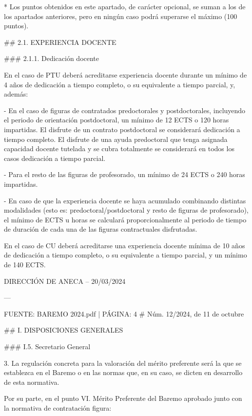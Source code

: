 \documentclass{article}
\begin{document}
\begin{itemize}
\begin{itemize}
\begin{scriptsize}
                  * Los puntos obtenidos en este apartado, de carácter opcional, se suman a los de los apartados anteriores, pero en ningún caso podrá superarse el máximo (100 puntos).

                  \#\# 2.1. EXPERIENCIA DOCENTE

                  \#\#\# 2.1.1. Dedicación docente

                  En el caso de PTU deberá acreditarse experiencia docente durante un mínimo de 4 años de dedicación a tiempo completo, o su equivalente a tiempo parcial, y, además:

                  - En el caso de figuras de contratados predoctorales y postdoctorales, incluyendo el periodo de orientación postdoctoral, un mínimo de 12 ECTS o 120 horas impartidas. El disfrute de un contrato postdoctoral se considerará dedicación a tiempo completo. El disfrute de una ayuda predoctoral que tenga asignada capacidad docente tutelada y se cubra totalmente se considerará en todos los casos dedicación a tiempo parcial.

                  - Para el resto de las figuras de profesorado, un mínimo de 24 ECTS o 240 horas impartidas.

                  - En caso de que la experiencia docente se haya acumulado combinando distintas modalidades (esto es: predoctoral/postdoctoral y resto de figuras de profesorado), el mínimo de ECTS u horas se calculará proporcionalmente al periodo de tiempo de duración de cada una de las figuras contractuales disfrutadas.

                  En el caso de CU deberá acreditarse una experiencia docente mínima de 10 años de dedicación a tiempo completo, o su equivalente a tiempo parcial, y un mínimo de 140 ECTS.

                  DIRECCIÓN DE ANECA – 20/03/2024

                  ---

                  FUENTE: BAREMO 2024.pdf | PÁGINA: 4
                  \# Núm. 12/2024, de 11 de octubre

                  \#\# I. DISPOSICIONES GENERALES

                  \#\#\# I.5. Secretario General

                  3. La regulación concreta para la valoración del mérito preferente será la que se establezca en el Baremo o en las normas que, en su caso, se dicten en desarrollo de esta normativa.

                  Por su parte, en el punto VI. Mérito Preferente del Baremo aprobado junto con la normativa de contratación figura:


\end{scriptsize}
\end{itemize}
\end{itemize}
\end{document}
